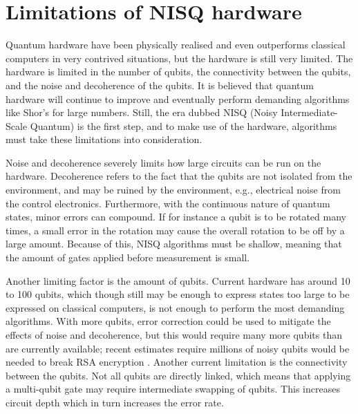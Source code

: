 \section{Limitations of NISQ hardware}
Quantum hardware have been physically realised and even outperforms classical computers in very contrived situations, but the hardware is still very limited.
The hardware is limited in the number of qubits, the connectivity between the qubits, and the noise and decoherence of the qubits.
It is believed that quantum hardware will continue to improve and eventually perform demanding algorithms like Shor's for large numbers.
Still, the era dubbed NISQ (Noisy Intermediate-Scale Quantum) is the first step, and to make use of the hardware, algorithms must take these limitations into consideration.

Noise and decoherence severely limits how large circuits can be run on the hardware.
Decoherence refers to the fact that the qubits are not isolated from the environment, and may be ruined by the environment, e.g., electrical noise from the control electronics.
Furthermore, with the continuous nature of quantum states, minor errors can compound.
If for instance a qubit is to be rotated many times, a small error in the rotation may cause the overall rotation to be off by a large amount.
Because of this, NISQ algorithms must be shallow, meaning that the amount of gates applied before measurement is small.

Another limiting factor is the amount of qubits.
Current hardware has around 10 to 100 qubits, which though still may be enough to express states too large to be expressed on classical computers, is not enough to perform the most demanding algorithms.
With more qubits, error correction could be used to mitigate the effects of noise and decoherence, but this would require many more qubits than are currently available; recent estimates require millions of noisy qubits would be needed to break RSA encryption \cite{gidney2021}.
Another current limitation is the connectivity between the qubits.
Not all qubits are directly linked, which means that applying a multi-qubit gate may require intermediate swapping of qubits.
This increases circuit depth which in turn increases the error rate.